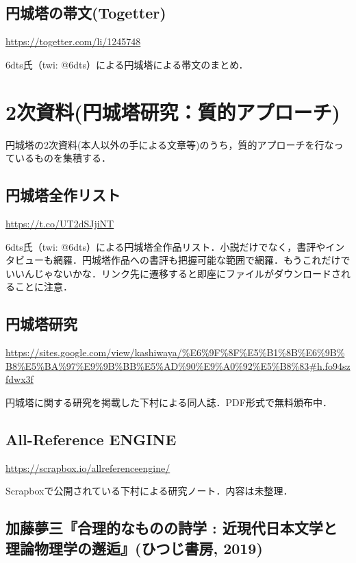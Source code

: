 \documentclass[10pt, a5paper, twoside]{jsarticle}
\theoremstyle{definition}
\begin{document}
		\subsection{円城塔の帯文(Togetter)}

			\url{https://togetter.com/li/1245748}

			6dts氏（twi: @6dts）による円城塔による帯文のまとめ．	

	\section{2次資料(円城塔研究：質的アプローチ)}

		円城塔の2次資料(本人以外の手による文章等)のうち，質的アプローチを行なっているものを集積する．

		\subsection{円城塔全作リスト}
		
			\url{https://t.co/UT2dSJjiNT}

			6dts氏（twi: @6dts）による円城塔全作品リスト．小説だけでなく，書評やインタビューも網羅．円城塔作品への書評も把握可能な範囲で網羅．もうこれだけでいいんじゃないかな．リンク先に遷移すると即座にファイルがダウンロードされることに注意．


		\subsection{円城塔研究}
		
			\url{https://sites.google.com/view/kashiwaya/%E6%9F%8F%E5%B1%8B%E6%9B%B8%E5%BA%97%E9%9B%BB%E5%AD%90%E9%A0%92%E5%B8%83#h.fo94szfdwx3f}

			円城塔に関する研究を掲載した下村による同人誌．PDF形式で無料頒布中．

		\subsection{All-Reference ENGINE}

			\url{https://scrapbox.io/allreferenceengine/}

			Scrapboxで公開されている下村による研究ノート．内容は未整理．

		\subsection{加藤夢三『合理的なものの詩学 : 近現代日本文学と理論物理学の邂逅』(ひつじ書房, 2019)}
\end{document}
